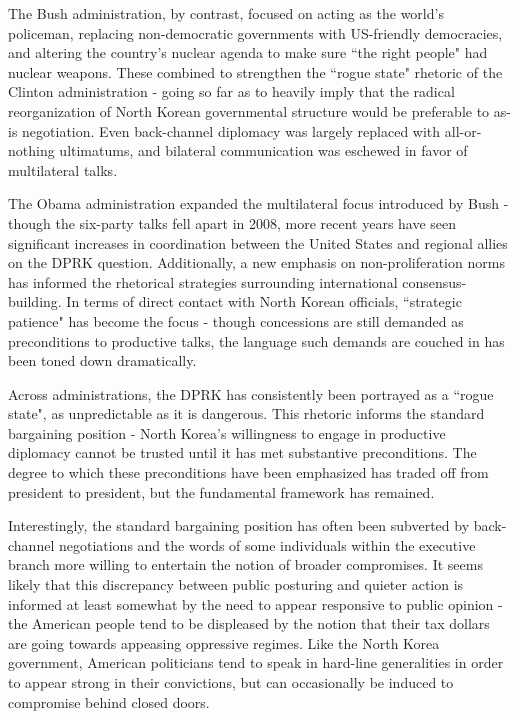 \documentclass{article}
\begin{document}
The Bush administration, by contrast, focused on acting as the world's policeman, replacing non-democratic governments with US-friendly democracies, and altering the country's nuclear agenda to make sure ``the right people" had nuclear weapons. These combined to strengthen the ``rogue state" rhetoric of the Clinton administration - going so far as to heavily imply that the radical reorganization of North Korean governmental structure would be preferable to as-is negotiation. Even back-channel diplomacy was largely replaced with all-or-nothing ultimatums, and bilateral communication was eschewed in favor of multilateral talks.

The Obama administration expanded the multilateral focus introduced by Bush - though the six-party talks fell apart in 2008, more recent years have seen significant increases in coordination between the United States and regional allies on the DPRK question. Additionally, a new emphasis on non-proliferation norms has informed the rhetorical strategies surrounding international consensus-building. In terms of direct contact with North Korean officials, ``strategic patience" has become the focus - though concessions are still demanded as preconditions to productive talks, the language such demands are couched in has been toned down dramatically.

Across administrations, the DPRK has consistently been portrayed as a ``rogue state", as unpredictable as it is dangerous. This rhetoric informs the standard bargaining position - North Korea's willingness to engage in productive diplomacy cannot be trusted until it has met substantive preconditions. The degree to which these preconditions have been emphasized has traded off from president to president, but the fundamental framework has remained. 

Interestingly, the standard bargaining position has often been subverted by back-channel negotiations and the words of some individuals within the executive branch more willing to entertain the notion of broader compromises. It seems likely that this discrepancy between public posturing and quieter action is informed at least somewhat by the need to appear responsive to public opinion - the American people tend to be displeased by the notion that their tax dollars are going towards appeasing oppressive regimes. Like the North Korea government, American politicians tend to speak in hard-line generalities in order to appear strong in their convictions, but can occasionally be induced to compromise behind closed doors.
\end{document}
